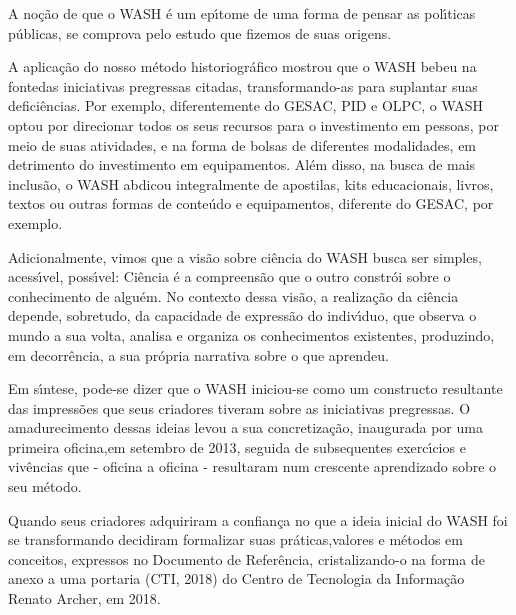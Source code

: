 \documentclass[
12pt,		%
openright,	%
twoside,  %
a4paper,			%
chapter=TITLE,		%
english,			%
french,				%
spanish,			%
brazil				%
]{USPSC-classe/USPSC}
\begin{document}
A no\c{c}\~ao de que o WASH \'e um ep\'{\i}tome de uma forma de pensar as pol\'{\i}ticas p\'ublicas, se comprova pelo estudo que fizemos de suas origens.









A aplica\c{c}\~ao do nosso m\'etodo historiogr\'afico mostrou que o WASH \textquotedbl bebeu na fonte\textquotedbl  das iniciativas pregressas citadas, transformando-as para suplantar suas defici\^encias.  Por exemplo, diferentemente do GESAC, PID e OLPC, o WASH optou por direcionar todos os seus recursos para o investimento em pessoas, por meio de suas atividades, e na forma de bolsas de diferentes modalidades, em detrimento do investimento em equipamentos. Al\'em disso, na busca de mais inclus\~ao, o WASH abdicou integralmente de apostilas, kits educacionais, livros, textos ou outras formas de conte\'udo e equipamentos, diferente do GESAC, por exemplo.









Adicionalmente, vimos que a vis\~ao sobre ci\^encia do WASH busca ser  simples, acess\'{\i}vel, poss\'{\i}vel: \textquotedbl Ci\^encia \'e a compreens\~ao que o outro constr\'oi sobre o conhecimento de algu\'em\textquotedbl . No contexto dessa vis\~ao, a realiza\c{c}\~ao da ci\^encia depende, sobretudo, da capacidade de express\~ao do indiv\'{\i}duo, que observa o mundo a sua volta, analisa e organiza os conhecimentos existentes, produzindo, em decorr\^encia, a sua pr\'opria narrativa sobre o que aprendeu.









Em s\'{\i}ntese, pode-se dizer que o WASH iniciou-se como um constructo resultante das impress\~oes que seus criadores tiveram sobre as iniciativas pregressas. O amadurecimento dessas ideias levou a sua concretiza\c{c}\~ao, inaugurada por uma primeira oficina,em setembro de 2013, seguida de subsequentes exerc\'{\i}cios e  viv\^encias que - oficina a oficina - resultaram num crescente aprendizado sobre o seu m\'etodo.









Quando seus criadores adquiriram a confian\c{c}a no que a ideia inicial do WASH foi se transformando decidiram formalizar suas pr\'aticas,valores e m\'etodos em conceitos, expressos  no Documento de Refer\^encia, cristalizando-o na forma de anexo a uma portaria  (CTI, 2018)  do Centro de Tecnologia da Informa\c{c}\~ao Renato Archer, em 2018.
\end{document}
